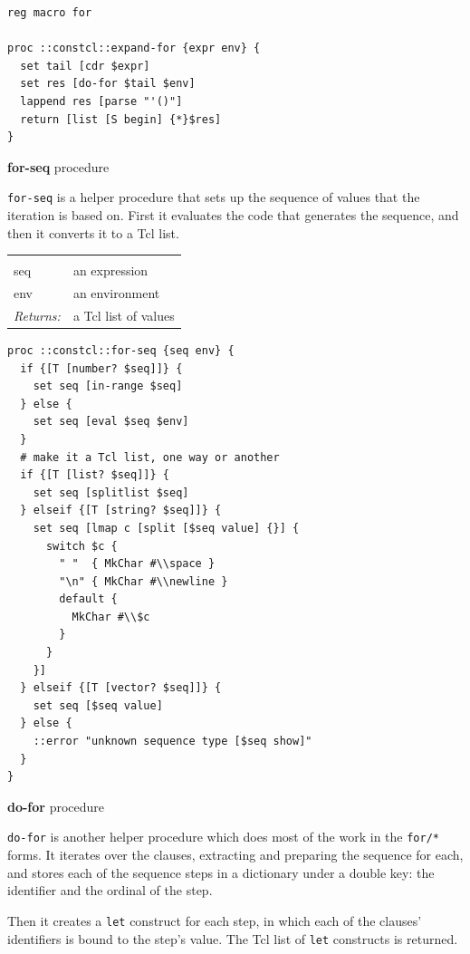 \documentclass[twoside]{report}
\begin{document}
\begin{lstlisting}
reg macro for

proc ::constcl::expand-for {expr env} {
  set tail [cdr $expr]
  set res [do-for $tail $env]
  lappend res [parse "'()"]
  return [list [S begin] {*}$res]
}
\end{lstlisting}

\textbf{for-seq} procedure

\texttt{for-seq} is a helper procedure that sets up the sequence of values that the iteration is based on. First it evaluates the code that generates the sequence, and then it converts it to a Tcl list.

\noindent\begin{tabular}{ |p{1.9cm} p{8cm}| }
\hline
\rowcolor[HTML]{CCCCCC} \multicolumn{2}{|l|}{\bf for-seq (internal)} \\
seq & an expression \\
env & an environment \\
\textit{Returns:} & a Tcl list of values \\
\hline
\end{tabular}

\begin{lstlisting}
proc ::constcl::for-seq {seq env} {
  if {[T [number? $seq]]} {
    set seq [in-range $seq]
  } else {
    set seq [eval $seq $env]
  }
  # make it a Tcl list, one way or another
  if {[T [list? $seq]]} {
    set seq [splitlist $seq]
  } elseif {[T [string? $seq]]} {
    set seq [lmap c [split [$seq value] {}] {
      switch $c {
        " "  { MkChar #\\space }
        "\n" { MkChar #\\newline }
        default {
          MkChar #\\$c
        }
      }
    }]
  } elseif {[T [vector? $seq]]} {
    set seq [$seq value]
  } else {
    ::error "unknown sequence type [$seq show]"
  }
}
\end{lstlisting}

\textbf{do-for} procedure

\texttt{do-for} is another helper procedure which does most of the work in the \texttt{for/*} forms. It iterates over the clauses, extracting and preparing the sequence for each, and stores each of the sequence steps in a dictionary under a double key: the identifier and the ordinal of the step.

Then it creates a \texttt{let} construct for each step, in which each of the clauses' identifiers is bound to the step's value. The Tcl list of \texttt{let} constructs is returned.
\end{document}
